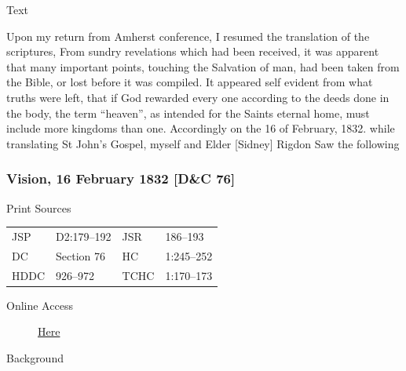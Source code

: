 			\begin{description}
				\item[Text]
			\end{description}
			
				Upon my return from Amherst conference, I resumed the translation of the scriptures, From sundry revelations which had been received, it was apparent that many important points, touching the Salvation of man, had been taken from the Bible, or lost before it was compiled. It appeared self evident from what truths were left, that if God rewarded every one according to the deeds done in the body, the term ``heaven'', as intended for the Saints eternal home, must include more kingdoms than one. Accordingly on the 16 of February, 1832. while translating St John's Gospel, myself and Elder [Sidney] Rigdon Saw the following
				
		\subsubsection{Vision, 16 February 1832 [D\&C 76]}
			\label{EMS-1832-JS-16-FEB-1832}
		
			\begin{description}
				\item[Print Sources]
			\end{description}

				\begin{tabular}{p{0.5in}p{1in}p{0.5in}p{1in}}
				JSP	 	& D2:179--192	& JSR 		& 186--193 \\
				DC	 	& Section 76 	& HC 		& 1:245--252 \\
				HDDC 	& 926--972		& TCHC 		& 1:170--173 \\
				\end{tabular}
			
			\begin{description}
				\item[Online Access] \href{https://www.josephsmithpapers.org/paper-summary/vision-16-february-1832-dc-76/1}{Here}
			\end{description}
			
			\begin{description}
				\item[Background]
			\end{description}
			
